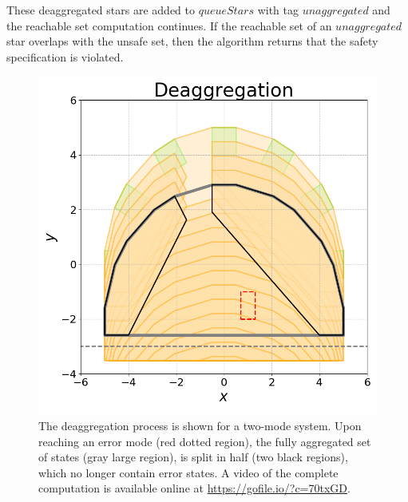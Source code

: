 These deaggregated stars are added to $queueStars$ with tag $unaggregated$ and the reachable set computation continues. 
%
If the reachable set of an $unaggregated$ star overlaps with the unsafe set, then the algorithm returns that the safety specification is violated.

\begin{figure}[h!]
\centerline{\includegraphics[width=0.7\columnwidth]{images/deagg.png}}
\caption{The deaggregation process is shown for a two-mode system. Upon reaching an error mode (red dotted region), the fully aggregated set of states (gray large region), is split in half (two black regions), which no longer contain error states. A video of the complete computation is available online at \url{https://gofile.io/?c=70txGD}.}
\end{figure}


